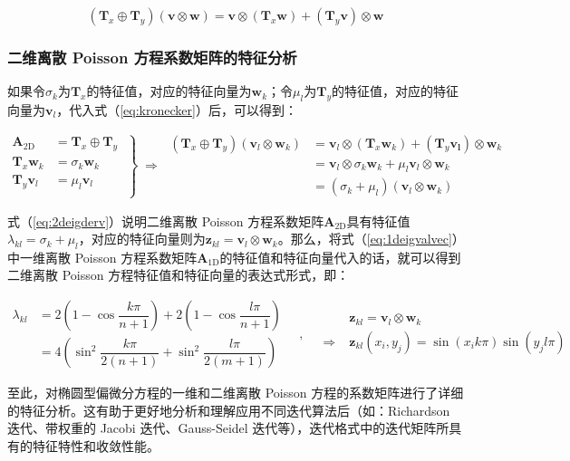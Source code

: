 \documentclass[12pt, UTF8, nofonts]{ctexart}
\begin{document}
\begin{equation}
  \label{eq:kronecker}
  (\boldsymbol{T}_x \oplus \boldsymbol{T}_y)(\boldsymbol{v} \otimes \boldsymbol{w}) = \boldsymbol{v} \otimes (\boldsymbol{T}_x\boldsymbol{w}) + (\boldsymbol{T}_y\boldsymbol{v}) \otimes \boldsymbol{w}
\end{equation}

\subsubsection*{二维离散 Poisson 方程系数矩阵的特征分析}

如果令$\sigma_k$为$\boldsymbol{T}_x$的特征值，对应的特征向量为$\boldsymbol{w}_k$；令$\mu_l$为$\boldsymbol{T}_y$的特征值，对应的特征向量为$\boldsymbol{v}_l$，代入式（\ref{eq:kronecker}）后，可以得到：

\begin{equation}
  \label{eq:2deigderv}
  \left.\begin{aligned}
    \boldsymbol{A}_{\mathrm{2D}} &= \boldsymbol{T}_x \oplus \boldsymbol{T}_y \\
    \boldsymbol{T}_x \boldsymbol{w}_k &= \sigma_k \boldsymbol{w}_k \\
    \boldsymbol{T}_y \boldsymbol{v}_l &= \mu_l \boldsymbol{v}_l \\
  \end{aligned}\;\right\} \;\Rightarrow\;
  \begin{aligned}
    (\boldsymbol{T}_x \oplus \boldsymbol{T}_y)(\boldsymbol{v}_l \otimes \boldsymbol{w}_k) &= \boldsymbol{v}_l \otimes (\boldsymbol{T}_x \boldsymbol{w}_k) + (\boldsymbol{T}_y\boldsymbol{v_l}) \otimes \boldsymbol{w}_k \\
    &= \boldsymbol{v}_l \otimes \sigma_k \boldsymbol{w}_k + \mu_l\boldsymbol{v}_l \otimes \boldsymbol{w}_k \\
    &= (\sigma_k+\mu_l)(\boldsymbol{v}_l \otimes \boldsymbol{w}_k)
  \end{aligned}
\end{equation}

式（\ref{eq:2deigderv}）说明二维离散 Poisson 方程系数矩阵$\boldsymbol{A}_{\mathrm{2D}}$具有特征值$\lambda_{kl}=\sigma_k+\mu_l$，对应的特征向量则为$\boldsymbol{z}_{kl}=\boldsymbol{v}_l\otimes\boldsymbol{w}_k$。那么，将式（\ref{eq:1deigvalvec}）中一维离散 Poisson 方程系数矩阵$\boldsymbol{A}_{\mathrm{1D}}$的特征值和特征向量代入的话，就可以得到二维离散 Poisson 方程特征值和特征向量的表达式形式，即：

\begin{equation}
  \label{eq:2deigvalvec}
  \begin{aligned}
    \lambda_{kl} &= 2 \left(1 - \cos\dfrac{k\pi}{n+1}\right) + 2 \left(1 - \cos\dfrac{l\pi}{n+1}\right) \\
    &= 4 \left( \sin^2\dfrac{k\pi}{2(n+1)} + \sin^2\dfrac{l\pi}{2(m+1)}\right)
  \end{aligned} \quad,\quad
  \begin{aligned}
    & \boldsymbol{z}_{kl} = \boldsymbol{v}_l \otimes \boldsymbol{w}_k \\
    \Rightarrow\;& \boldsymbol{z}_{kl}(x_i,y_j) = \sin(x_ik\pi) \sin(y_jl\pi)
  \end{aligned}
\end{equation}

至此，对椭圆型偏微分方程的一维和二维离散 Poisson 方程的系数矩阵进行了详细的特征分析。这有助于更好地分析和理解应用不同迭代算法后（如：Richardson 迭代、带权重的 Jacobi 迭代、Gauss-Seidel 迭代等），迭代格式中的迭代矩阵所具有的特征特性和收敛性能。

\end{document}
